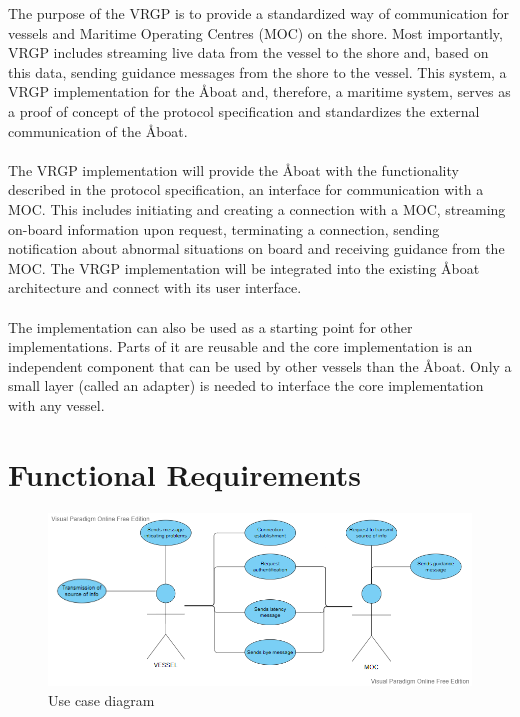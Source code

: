 The purpose of the VRGP is to provide a standardized way of communication for vessels and Maritime Operating Centres (MOC) on the shore. Most importantly, VRGP includes streaming live data from the vessel to the shore and, based on this data, sending guidance messages from the shore to the vessel. This system, a VRGP implementation for the Åboat and, therefore, a maritime system, serves as a proof of concept of the protocol specification and standardizes the external communication of the Åboat.
\\\\
The VRGP implementation will provide the Åboat with the functionality described in the protocol specification, an interface for communication with a MOC. This includes initiating and creating a connection with a MOC, streaming on-board information upon request, terminating a connection, sending notification about abnormal situations on board and receiving guidance from the MOC. The VRGP implementation will be integrated into the existing Åboat architecture and connect with its user interface.
\\\\
The implementation can also be used as a starting point for other implementations. Parts of it are reusable and the core implementation is an independent component that can be used by other vessels than the Åboat. Only a small layer (called an adapter) is needed to interface the core implementation with any vessel.

\section{Functional Requirements}\label{sec:func-requirements}

\begin{figure}[ht]
	\centering
	\includegraphics[width=\linewidth]{diagrams/use-case-diagram}
	\caption{Use case diagram}
	\label{fig:use-case-diagram}
\end{figure}

